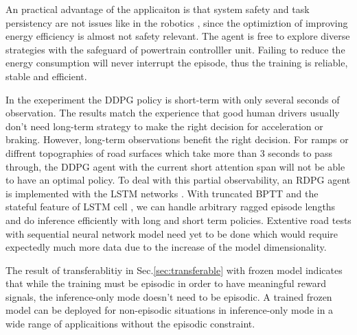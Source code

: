 \documentclass[conference]{IEEEtran}
\begin{document}
An practical advantage of the applicaiton is that system safety and task persistency are not issues like in the robotics \parencite{DBLP:journals_ijrr_IbarzTFKPL21}, since the optimiztion of improving energy efficiency is almost not safety relevant. The agent is free to explore diverse strategies with the safeguard of powertrain controlller unit. Failing to reduce the energy consumption will never interrupt the episode, thus the training is reliable, stable and efficient.

In the exeperiment the DDPG policy is short-term with only several seconds of observation. The results match the experience that good human drivers usually don't need long-term strategy to make the right decision for acceleration or braking. However, long-term observations benefit the right decision. For ramps or diffrent topographies of road surfaces which take more than 3 seconds to pass through, the DDPG agent with the current short attention span will not be able to have an optimal policy. To deal with this partial observability, an RDPG agent \parencite{heess15:_memor} is implemented with the LSTM networks \parencite{Hochreiter_1997}. With truncated BPTT \parencite{sutskever2013training} and the stateful feature of LSTM cell \parencite{chollet2015keras}, we can handle arbitrary ragged episode lengths and do inference efficiently with long and short term policies. Extentive road tests with sequential neural network model need yet to be done which would require expectedly much more data due to the increase of the model dimensionality.

The result of transferablitiy in Sec.\@\ref{sec:transferable} with frozen model indicates that while the training must be episodic in order to have meaningful reward signals, the inference-only mode doesn't need to be episodic. A trained frozen model can be deployed for non-episodic situations in inference-only mode in a wide range of applicaitions without the episodic constraint.
\end{document}

